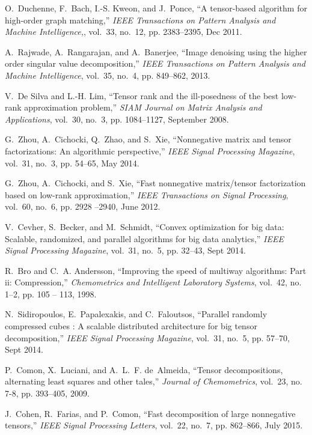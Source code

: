 \documentclass[10pt,twocolumn,twoside]{IEEEtran}
\begin{document}
\begin{thebibliography}{10}
O.~Duchenne, F.~Bach, I.-S. Kweon, and J.~Ponce, ``A tensor-based algorithm for
  high-order graph matching,'' \emph{IEEE Transactions on Pattern Analysis and
  Machine Intelligence,}, vol.~33, no.~12, pp. 2383--2395, Dec 2011.

A.~Rajwade, A.~Rangarajan, and A.~Banerjee, ``Image denoising using the higher
  order singular value decomposition,'' \emph{IEEE Transactions on Pattern
  Analysis and Machine Intelligence}, vol.~35, no.~4, pp. 849--862, 2013.

V.~{De Silva} and L.-H. Lim, ``Tensor rank and the ill-posedness of the best
  low-rank approximation problem,'' \emph{SIAM Journal on Matrix Analysis and
  Applications}, vol.~30, no.~3, pp. 1084--1127, September 2008.

G.~Zhou, A.~Cichocki, Q.~Zhao, and S.~Xie, ``Nonnegative matrix and tensor
  factorizations: An algorithmic perspective,'' \emph{IEEE Signal Processing
  Magazine}, vol.~31, no.~3, pp. 54--65, May 2014.

G.~Zhou, A.~Cichocki, and S.~Xie, ``Fast nonnegative matrix/tensor
  factorization based on low-rank approximation,'' \emph{IEEE Transactions on
  Signal Processing}, vol.~60, no.~6, pp. 2928 --2940, June 2012.

V.~Cevher, S.~Becker, and M.~Schmidt, ``Convex optimization for big data:
  Scalable, randomized, and parallel algorithms for big data analytics,''
  \emph{IEEE Signal Processing Magazine}, vol.~31, no.~5, pp. 32--43, Sept
  2014.

R.~Bro and C.~A. Andersson, ``Improving the speed of multiway algorithms: Part
  ii: Compression,'' \emph{Chemometrics and Intelligent Laboratory Systems},
  vol.~42, no. 1--2, pp. 105 -- 113, 1998.

N.~Sidiropoulos, E.~Papalexakis, and C.~Faloutsos, ``Parallel randomly
  compressed cubes : A scalable distributed architecture for big tensor
  decomposition,'' \emph{IEEE Signal Processing Magazine}, vol.~31, no.~5, pp.
  57--70, Sept 2014.

P.~Comon, X.~Luciani, and A.~L.~F. de~Almeida, ``Tensor decompositions,
  alternating least squares and other tales,'' \emph{Journal of Chemometrics},
  vol.~23, no. 7-8, pp. 393--405, 2009.

J.~Cohen, R.~Farias, and P.~Comon, ``Fast decomposition of large nonnegative
  tensors,'' \emph{IEEE Signal Processing Letters}, vol.~22, no.~7, pp.
  862--866, July 2015.


\end{thebibliography}
\end{document}
